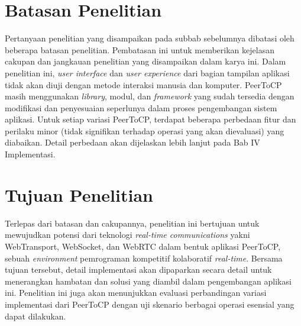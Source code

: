 \section{Batasan Penelitian}
\label{sec:batasanMasalah}
Pertanyaan penelitian yang disampaikan pada subbab sebelumnya dibatasi oleh beberapa batasan penelitian. Pembatasan ini untuk memberikan kejelasan cakupan dan jangkauan penelitian yang disampaikan dalam karya ini. Dalam penelitian ini, \textit{user interface} dan \textit{user experience} dari bagian tampilan aplikasi tidak akan diuji dengan metode interaksi manusia dan komputer. PeerToCP masih menggunakan \textit{library}, modul, dan \textit{framework} yang sudah tersedia dengan modifikasi dan penyesuaian seperlunya dalam proses pengembangan sistem aplikasi. Untuk setiap variasi PeerToCP, terdapat beberapa perbedaan fitur dan perilaku minor (tidak signifikan terhadap operasi yang akan dievaluasi) yang diabaikan. Detail perbedaan akan dijelaskan lebih lanjut pada Bab IV Implementasi.

\section{Tujuan Penelitian}
\label{sec:tujuan}
Terlepas dari batasan dan cakupannya, penelitian ini bertujuan untuk mewujudkan potensi dari teknologi \textit{real-time communications} yakni WebTransport, WebSocket, dan WebRTC dalam bentuk aplikasi PeerToCP, sebuah \textit{environment} pemrograman kompetitif kolaboratif \textit{real-time}. Bersama tujuan tersebut, detail implementasi akan dipaparkan secara detail untuk menerangkan hambatan dan solusi yang diambil dalam pengembangan aplikasi ini. Penelitian ini juga akan menunjukkan evaluasi perbandingan variasi implementasi dari PeerToCP dengan uji skenario berbagai operasi esensial yang dapat dilakukan.

